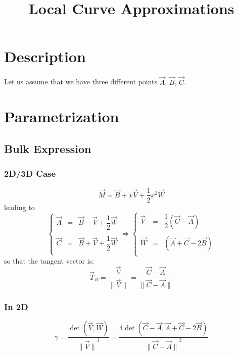 \documentclass[aps,10pt]{revtex4}
\newcommand{\mynorm}[1]{{\parallel{#1}\parallel}}
\newcommand{\myunit}[1]{\dfrac{{#1}}{\mynorm{{#1}}}}
\begin{document}
\title{Local Curve Approximations}
\maketitle

\section{Description}

Let us assume that we have three different points $\vec{A}$, $\vec{B}$, $\vec{C}$.

\section{Parametrization}

\subsection{Bulk Expression}
\subsubsection{2D/3D Case}
\begin{equation}
	\vec{M} = \vec{B} + x \vec{V} + \dfrac{1}{2}x^2 \vec{W}
\end{equation}
leading to
\begin{equation}
\left\lbrace
\begin{array}{rcl}
	\vec{A} & = & \vec{B} - \vec{V} + \dfrac{1}{2}\vec{W}\\
	\\
	\vec{C} & = & \vec{B} + \vec{V} + \dfrac{1}{2}\vec{W}\\
\end{array}
\right.
\Rightarrow
\left\lbrace
\begin{array}{rcl}
	\vec{V} & = & \dfrac{1}{2}\left(\vec{C}-\vec{A}\right)\\
	\\
	\vec{W} & = &  \left(\vec{A}+\vec{C}-2\vec{B}\right)\\
\end{array}
\right.
\end{equation}
so that the tangent vector is:
\begin{equation}
	\vec{T}_B = \myunit{\vec{V}} = \myunit{\vec{C}-\vec{A}}
\end{equation}

\subsubsection{In 2D}
\begin{equation}
	\gamma = \dfrac{\det\left(\vec{V},\vec{W}\right)}{\mynorm{\vec{V}}^3} = \dfrac{4\det\left(\vec{C}-\vec{A},\vec{A}+\vec{C}-2\vec{B}\right)}{\mynorm{\vec{C}-\vec{A}}^3}
\end{equation}
\end{document}
